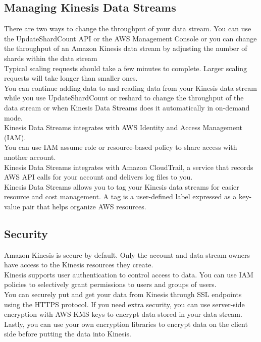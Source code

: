 \documentclass[12pt, letterpaper, twoside]{article}
\begin{document}
\subsection{Managing Kinesis Data Streams}
There are two ways to change the throughput of your data stream. You can use the UpdateShardCount API or the AWS Management Console
or you can change the throughput of an Amazon Kinesis data stream by adjusting the number of shards within the data stream\\

Typical scaling requests should take a few minutes to complete. Larger scaling requests will take longer than smaller ones.\\

You can continue adding data to and reading data from your Kinesis data stream while you use UpdateShardCount or reshard to 
change the throughput of the data stream or when Kinesis Data Streams does it automatically in on-demand mode.\\

Kinesis Data Streams integrates with AWS Identity and Access Management (IAM).\\

You can use IAM assume role or resource-based policy to share access with another account.\\

Kinesis Data Streams integrates with Amazon CloudTrail, a service that records AWS API calls for your account and delivers log files to you.\\

Kinesis Data Streams allows you to tag your Kinesis data streams for easier resource and cost management. A tag is a user-defined label expressed 
as a key-value pair that helps organize AWS resources.\\

\subsection{Security}
Amazon Kinesis is secure by default. Only the account and data stream owners have access to the Kinesis resources they create.\\
Kinesis supports user authentication to control access to data. You can use IAM policies to selectively grant permissions to users 
and groups of users.\\
You can securely put and get your data from Kinesis through SSL endpoints using the HTTPS protocol. If you need extra security, you 
can use server-side encryption with AWS KMS keys to encrypt data stored in your data stream.\\
Lastly, you can use your own encryption libraries to encrypt data on the client side before putting the data into Kinesis.\\
\end{document}
